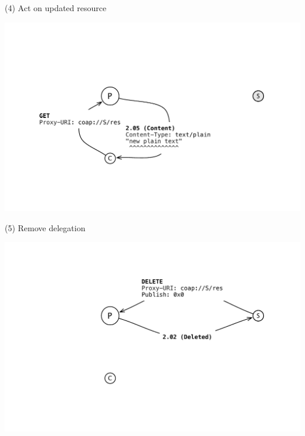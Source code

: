 \documentclass{beamer}
\begin{document}
\begin{frame}{(4) Act on updated resource}
 \begin{center}
  \includegraphics[width=\textwidth]{../../share/images/publish3.pdf}
 \end{center}
\end{frame}

\begin{frame}{(5) Remove delegation}
 \begin{center}
  \includegraphics[width=\textwidth]{../../share/images/publish4.pdf}
 \end{center}
\end{frame}
\end{document}
